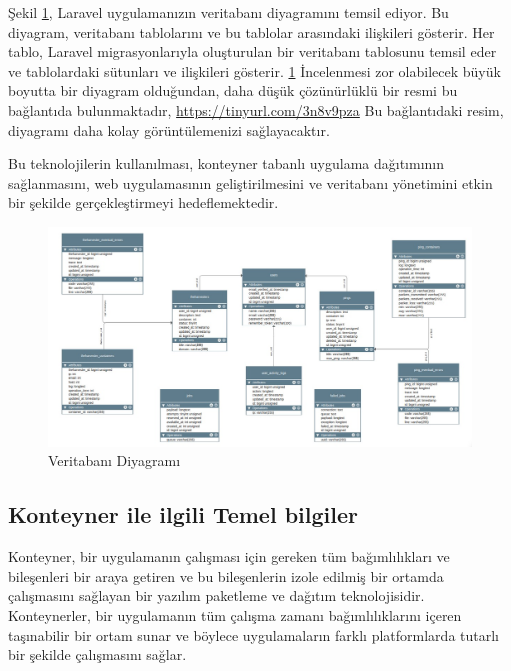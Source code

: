 Şekil \ref{fig:veritabani_diyagrami}, Laravel uygulamanızın veritabanı diyagramını temsil ediyor. Bu diyagram, veritabanı tablolarını ve bu tablolar arasındaki ilişkileri gösterir. Her tablo, Laravel migrasyonlarıyla oluşturulan bir veritabanı tablosunu temsil eder ve tablolardaki sütunları ve ilişkileri gösterir. \ref{fig:veritabani_diyagrami} İncelenmesi zor olabilecek büyük boyutta bir diyagram olduğundan, daha düşük çözünürlüklü bir resmi bu bağlantıda bulunmaktadır, \href{https://tinyurl.com/3n8v9pza}{https://tinyurl.com/3n8v9pza} Bu bağlantıdaki resim, diyagramı daha kolay görüntülemenizi sağlayacaktır.

Bu teknolojilerin kullanılması, konteyner tabanlı uygulama dağıtımının sağlanmasını, web uygulamasının geliştirilmesini ve veritabanı yönetimini etkin bir şekilde gerçekleştirmeyi hedeflemektedir.
\begin{figure}[ht]
  \includegraphics[width=\linewidth]{images/diyagram.jpeg}
  \caption{Veritabanı Diyagramı}
  \label{fig:veritabani_diyagrami}
  \end{figure}
\subsection{Konteyner ile ilgili Temel bilgiler}
Konteyner, bir uygulamanın çalışması için gereken tüm bağımlılıkları ve bileşenleri bir araya getiren ve bu bileşenlerin izole edilmiş bir ortamda çalışmasını sağlayan bir yazılım paketleme ve dağıtım teknolojisidir. Konteynerler, bir uygulamanın tüm çalışma zamanı bağımlılıklarını içeren taşınabilir bir ortam sunar ve böylece uygulamaların farklı platformlarda tutarlı bir şekilde çalışmasını sağlar.\cite{domenici_bravo}

